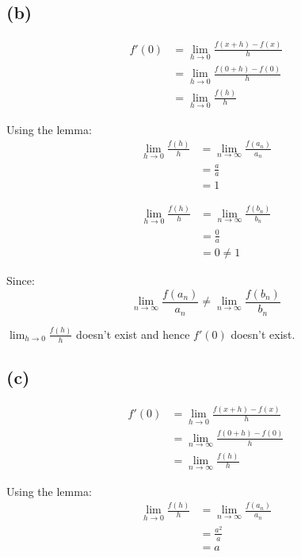 \documentclass[11pt]{article}
\begin{document}
\subsection{(b)}
\label{sec:org5862628}

\begin{align*}
f'(0) &= \lim_{h \rightarrow 0} \frac{f(x + h) - f(x)}{h} \\
&= \lim_{h \rightarrow 0} \frac{f(0 + h) - f(0)}{h} \\
&= \lim_{h \rightarrow 0} \frac{f(h)}{h}
\end{align*}

Using the lemma:
\begin{align*}
\lim_{h \rightarrow 0} \frac{f(h)}{h} &= \lim_{n \rightarrow \infty} \frac{f(a_n)}{a_n} \\
&= \frac{a}{a} \\
&= 1
\end{align*}

\begin{align*}
\lim_{h \rightarrow 0} \frac{f(h)}{h} &= \lim_{n \rightarrow \infty} \frac{f(b_n)}{b_n} \\
&= \frac{0}{a} \\
&= 0 \neq 1
\end{align*}

Since:
\[\lim_{n \rightarrow \infty} \frac{f(a_n)}{a_n} \neq \lim_{n \rightarrow \infty} \frac{f(b_n)}{b_n}\]

\(\lim_{h \rightarrow 0} \frac{f(h)}{h}\) doesn't exist and hence \(f'(0)\) doesn't exist.

\newpage

\subsection{(c)}
\label{sec:orgbea67b3}

\begin{align*}
f'(0) &= \lim_{h \rightarrow 0} \frac{f(x + h) - f(x)}{h} \\
&= \lim_{n \rightarrow \infty} \frac{f(0 + h) - f(0)}{h} \\
&= \lim_{n \rightarrow \infty} \frac{f(h)}{h}
\end{align*}

Using the lemma:
\begin{align*}
\lim_{h \rightarrow 0} \frac{f(h)}{h} &= \lim_{n \rightarrow \infty} \frac{f(a_n)}{a_n} \\
&= \frac{a^2}{a} \\
&= a
\end{align*}
\end{document}
